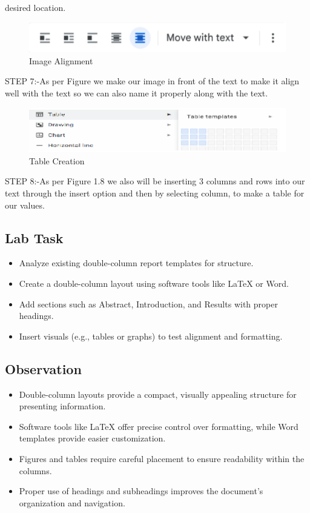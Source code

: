 \documentclass[a4paper,9pt]{article}
\begin{document}
\begin{enumerate}
	desired location.
	\begin{figure}[H]
		\centering
		\includegraphics[width=0.8\linewidth]{2.7.png}
		\caption{Image Alignment}
	\end{figure}
	STEP 7:-As per Figure we make our image in front of the text to make it align well
	with the text so we can also name it properly along with the text.
	\begin{figure}[H]
		\centering
		\includegraphics[width=0.8\linewidth]{2.8.png}
		\caption{Table Creation}
		\end{figure}
		STEP 8:-As per Figure 1.8 we also will be inserting 3 columns and rows into our text
		through the insert option and then by selecting column, to make a table for
		our values.
		
\end{enumerate}

\subsection{Lab Task}

\begin{itemize}
	\item Analyze existing double-column report templates for structure.
	\item Create a double-column layout using software tools like LaTeX or Word.
	\item Add sections such as Abstract, Introduction, and Results with proper headings.
	\item Insert visuals (e.g., tables or graphs) to test alignment and formatting.
\end{itemize}

\subsection{Observation}
\begin{itemize}
	\item Double-column layouts provide a compact, visually appealing structure for presenting information.
	 
	\item Software tools like LaTeX offer precise control over formatting, while Word templates provide easier customization.
	\item  Figures and tables require careful placement to ensure readability within the columns.
	\item Proper use of headings and subheadings improves the document's organization and navigation.
\end{itemize}
\end{document}
